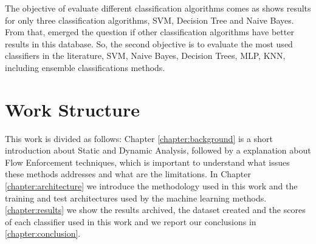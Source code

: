 The objective of evaluate different classification algorithms comes as \cite{rasthofer2014machine} shows results  for only three classification algorithms, SVM, Decision Tree and Naive Bayes. From that, emerged the question if other classification algorithms have better results in this database. So, the second objective is to evaluate the most used classifiers in the literature, SVM, Naive Bayes, Decision Trees, MLP, KNN, including ensemble classifications methods.


\section{Work Structure}\label{section:structure}

This work is divided as follows: Chapter \ref{chapter:background} is a short introduction about Static and Dynamic Analysis, followed by a explanation about Flow Enforcement techniques, which is important to understand what issues these methods addresses and what are the limitations. In Chapter \ref{chapter:architecture} we introduce the methodology used in this work and the training and test architectures used by the machine learning methods. \ref{chapter:results} we show the results archived, the dataset created and the scores of each classifier used in this work and we report our conclusions in \ref{chapter:conclusion}.
